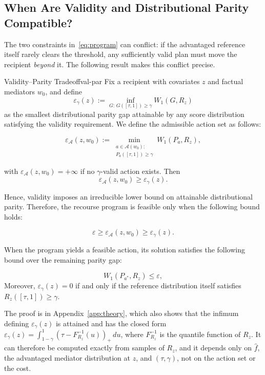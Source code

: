\subsection{When Are Validity and Distributional Parity Compatible?}
\label{sec:theory}

The two constraints in~\eqref{eq:program} can conflict: if the advantaged
reference itself rarely clears the threshold, any sufficiently valid plan must
move the recipient \emph{beyond} it. The following result makes this conflict
precise.

\begin{theorem}{Validity--Parity Tradeoff}{val-par}
Fix a recipient with covariates $z$ and factual mediators $w_0$, and define
\[
\varepsilon_\gamma(z)
:=
\inf_{G:\,G([\tau,1])\ge\gamma}
W_1(G,R_z)
\]
as the smallest distributional parity gap attainable by any score distribution satisfying the validity requirement. We define the admissible action set as follows:

\[
\varepsilon_{\mathcal A}(z,w_0)
:=
\min_{\substack{a\in\mathcal A(w_0):\\P_a([\tau,1])\ge\gamma}}
W_1(P_a,R_z),
\]

with $\varepsilon_{\mathcal A}(z,w_0)=+\infty$ if no $\gamma$-valid action exists. Then
\begin{equation}
\varepsilon_{\mathcal A}(z,w_0)
\ge
\varepsilon_\gamma(z).
\label{eq:feasibility_bound}
\end{equation}

Hence, validity imposes an irreducible lower bound on attainable distributional parity. Therefore, the recourse program is feasible only when the following bound holds:

\[
\varepsilon
\ge
\varepsilon_{\mathcal A}(z,w_0)
\ge
\varepsilon_\gamma(z).
\]

When the program yields a feasible action, its solution satisfies the following bound over the remaining parity gap:

\[
W_1(P_{a^\ast},R_z)\le\varepsilon,
\]
 Moreover, $\varepsilon_\gamma(z)=0$ if and only if the reference distribution itself satisfies $R_z([\tau,1])\ge\gamma$.
\end{theorem}

\noindent The proof is in Appendix~\ref{app:theory}, which also shows that
the infimum defining $\varepsilon_\gamma(z)$ is attained and has the closed form
$\varepsilon_\gamma(z)=\int_{1-\gamma}^{1}(\tau-F_{R_z}^{-1}(u))_+\,du$, where
$F_{R_z}^{-1}$ is the quantile function of $R_z$. It can therefore be computed
exactly from samples of $R_z$, and it depends only on $\hat f$, the advantaged
mediator distribution at $z$, and $(\tau,\gamma)$, not on the action set or
the cost.

